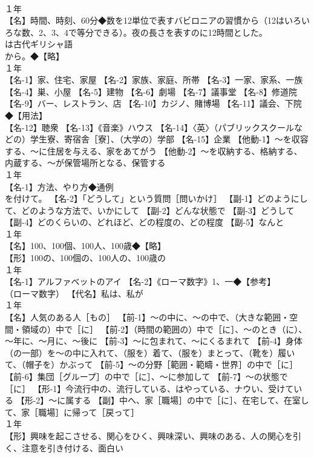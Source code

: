 \documentclass[8pt]{extreport}
\begin{document}
\begin{CJK}{UTF8}{min}
\\	１年	
\\	【名】時間、時刻、60分◆数を12単位で表すバビロニアの習慣から（12はいろいろな数、2、3、4で等分できる）。夜の長さを表すのに12時間とした。
\\	は古代ギリシャ語 
\\	から。◆【略】
\\	１年	
\\	【名-1】家、住宅、家屋 【名-2】家族、家庭、所帯 【名-3】一家、家系、一族 【名-4】巣、小屋 【名-5】建物 【名-6】劇場 【名-7】議事堂 【名-8】修道院 【名-9】バー、レストラン、店 【名-10】カジノ、賭博場 【名-11】議会、下院◆【用法】
\\	【名-12】聴衆 【名-13】《音楽》ハウス 【名-14】〈英〉（パブリックスクールなどの）学生寮、寄宿舎［寮］、（大学の）学部 【名-15】企業 【他動-1】～を収容する、～に住居を与える、家をあてがう 【他動-2】～を収納する、格納する、内蔵する、～が保管場所となる、保管する
\\	１年	
\\	【名-1】方法、やり方◆通例 
\\	を付けて。 【名-2】「どうして」という質問［問いかけ］ 【副-1】どのようにして、どのような方法で、いかにして 【副-2】どんな状態で 【副-3】どうして 【副-4】どのくらいの、どれほど、どの程度の、どの程度 【副-5】なんと
\\	１年	
\\	【名】100、100個、100人、100歳◆【略】
\\	【形】100の、100個の、100人の、100歳の
\\	１年	
\\	【名-1】アルファベットのアイ 【名-2】《ローマ数字》1、一◆【参考】
\\	（ローマ数字） 【代名】私は、私が
\\	１年	
\\	【名】人気のある人［もの］ 【前-1】～の中に、～の中で、（大きな範囲・空間・領域の）中で［に］ 【前-2】（時間の範囲の）中で［に］、～のとき（に）、～年に、～月に、～後に 【前-3】～に包まれて、～にくるまれて 【前-4】身体（の一部）を～の中に入れて、（服を）着て、（服を）まとって、（靴を）履いて、（帽子を）かぶって 【前-5】～の分野［範囲・範疇・世界］の中で［に］ 【前-6】集団［グループ］の中で［に］、～に参加して 【前-7】～の状態で［に］ 【形-1】今流行中の、流行している、はやっている、ナウい、受けている 【形-2】～に属する 【副】中へ、家［職場］の中で［に］、在宅して、在室して、家［職場］に帰って［戻って］
\\	１年	
\\	【形】興味を起こさせる、関心をひく、興味深い、興味のある、人の関心を引く、注意を引き付ける、面白い

\end{CJK}
\end{document}
